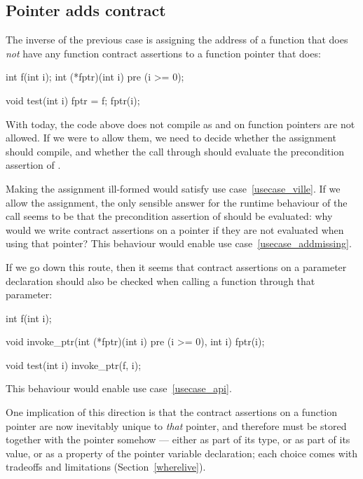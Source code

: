 
\subsection{Pointer adds contract}
\label{adding}

The inverse of the previous case is assigning the address of a function that does \emph{not} have any function contract assertions to a function pointer that does:
\begin{codeblock}
int f(int i);
int (*fptr)(int i)  pre (i >= 0);

void test(int i) {
  fptr = f;
  fptr(i); 
}
\end{codeblock}
With \cite{P2900R9} today, the code above does not compile as  and  on function pointers are not allowed. If we were to allow them, we need to decide whether the assignment should compile, and whether the call through  should evaluate the precondition assertion of .

Making the assignment ill-formed would satisfy use case~\ref{usecase_ville}. If we allow the assignment, the only sensible answer for the runtime behaviour of the call seems to be that the precondition assertion of  should be evaluated: why would we write contract assertions on a pointer if they are not evaluated when using that pointer? This behaviour would enable use case~\ref{usecase_addmissing}.

If we go down this route, then it seems that contract assertions on a parameter declaration should also be checked when calling a function through that parameter:
\begin{codeblock}
int f(int i);

void invoke_ptr(int (*fptr)(int i) pre (i >= 0), int i) {
  fptr(i);
}

void test(int i) {
  invoke_ptr(f, i);
}
\end{codeblock}
This behaviour would enable use case~\ref{usecase_api}.

One implication of this direction is that the contract assertions on a function pointer are now inevitably unique to \emph{that} pointer, and therefore must be stored together with the pointer somehow --- either as part of its type, or as part of its value, or as a property of the pointer variable declaration; each choice comes with  tradeoffs and limitations (Section~\ref{wherelive}).
 
